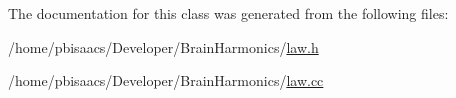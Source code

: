 The documentation for this class was generated from the following files\+:\begin{DoxyCompactItemize}
\item 
/home/pbisaacs/\+Developer/\+Brain\+Harmonics/\mbox{\hyperlink{law_8h}{law.\+h}}\item 
/home/pbisaacs/\+Developer/\+Brain\+Harmonics/\mbox{\hyperlink{law_8cc}{law.\+cc}}\end{DoxyCompactItemize}
